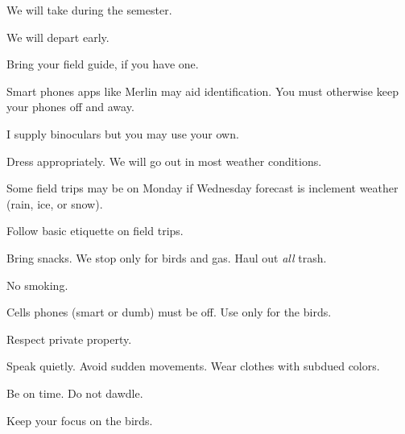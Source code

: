 \documentclass[t]{beamer}
\begin{document}
\begin{frame}[t,plain]{We will take  during the semester.}

	\vspace{-0.5\baselineskip}
	
	\hangpara {}
	
	\hangpara We will depart early. 
	
	
	\hangpara Bring your field guide, if you have one.

	\hangpara Smart phones apps like Merlin may aid identification. You must otherwise keep your phones off and away.

	\hangpara I supply binoculars but you may use your own. 

	\hangpara Dress appropriately. We will go out in most weather conditions.
		
	
	\hangpara Some field trips may be on Monday if Wednesday forecast is inclement weather (rain, ice, or snow).
	
\end{frame}

\begin{frame}[t,plain]{Follow basic etiquette on field trips.}

	\vspace{-0.5\baselineskip}
	
	\hangpara Bring snacks. We stop only for birds and gas. Haul out \textit{all} trash.
	
	\hangpara No smoking.
	

	\hangpara Cells phones (smart or dumb) must be off. Use only for the birds.

	\hangpara Respect private property.
	
	\hangpara Speak quietly. Avoid sudden movements. Wear clothes with subdued colors.
	
	\hangpara Be on time. Do not dawdle.
	
	\hangpara Keep your focus on the birds.
	
\end{frame}
\end{document}
